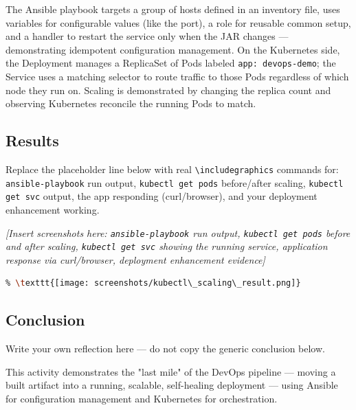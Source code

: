 \documentclass[12pt,a4paper]{article}
\begin{document}
The Ansible playbook targets a group of hosts defined in an inventory file, uses variables for configurable values (like the port), a role for reusable common setup, and a handler to restart the service only when the JAR changes --- demonstrating idempotent configuration management. On the Kubernetes side, the Deployment manages a ReplicaSet of Pods labeled \texttt{app: devops-demo}; the Service uses a matching selector to route traffic to those Pods regardless of which node they run on. Scaling is demonstrated by changing the replica count and observing Kubernetes reconcile the running Pods to match.

\subsection*{Results}
\begin{studentnote}
Replace the placeholder line below with real \texttt{\textbackslash includegraphics} commands for: \texttt{ansible-playbook} run output, \texttt{kubectl get pods} before/after scaling, \texttt{kubectl get svc} output, the app responding (curl/browser), and your deployment enhancement working.
\end{studentnote}

\textit{[Insert screenshots here: \texttt{ansible-playbook} run output, \texttt{kubectl get pods} before and after scaling, \texttt{kubectl get svc} showing the running service, application response via curl/browser, deployment enhancement evidence]}

\begin{lstlisting}[language=bash]
% Example of how to insert a real screenshot:
% \texttt{[image: screenshots/kubectl\_scaling\_result.png]}
\end{lstlisting}

\subsection*{Conclusion}
\begin{studentnote}
Write your own reflection here --- do not copy the generic conclusion below.
\end{studentnote}

This activity demonstrates the "last mile" of the DevOps pipeline --- moving a built artifact into a running, scalable, self-healing deployment --- using Ansible for configuration management and Kubernetes for orchestration.

\newpage
\end{document}
